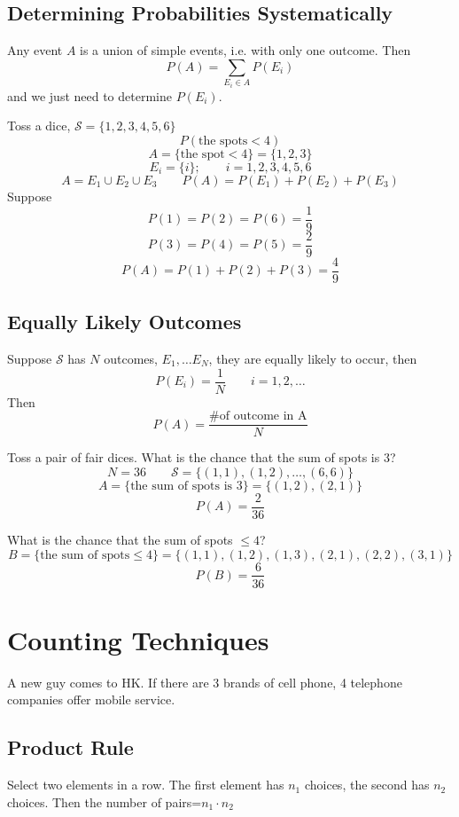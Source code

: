 \subsection{Determining Probabilities Systematically}
Any event $A$ is a union of simple events, i.e. with only one outcome.
Then\[P(A)=\sum_{E_i \in A}P(E_i)\]
and we just need to determine $P(E_i)$.

\begin{exmp}
Toss a dice, $\mathcal{S}=\{1,2,3,4,5,6\}$
\[P(\text{the spots}<4)\]
\[A=\{\text{the spot}< 4 \}=\{1,2,3\}\]
\[E_i=\{i\};\qquad i=1,2,3,4,5,6\]
\[A=E_1 \cup E_2 \cup E_3 \qquad  P(A)=P(E_1)+P(E_2)+P(E_3)\]
Suppose \[P(1)=P(2)=P(6)=\frac{1}{9}\]
\[P(3)=P(4)=P(5)=\frac{2}{9}\]
\[P(A)=P(1)+P(2)+P(3)=\frac{4}{9}\]
\end{exmp}

\subsection{Equally Likely Outcomes}
Suppose $\mathcal{S}$ has $N$ outcomes, $E_1,\dots E_N$, they are equally likely to occur, then
\[P(E_i)=\frac{1}{N} \qquad i=1,2,\dots\]
Then \[P(A)=\frac{\text{\# of outcome in A}}{N}\]

\begin{exmp}
Toss a pair of fair dices. What is the chance that the sum of spots is 3?
\[N=36 \qquad \mathcal{S}=\{(1,1),(1,2),\dots ,(6,6)\}\]
\[A=\{\text{the sum of spots is 3}\}=\{(1,2),(2,1)\}\]
\[P(A)=\frac{2}{36}\]
\end{exmp}

\begin{exmp}
What is the chance that the sum of spots $\leq 4$?
\[B=\{\text{the sum of spots}\leq 4\}=\{(1,1),(1,2),(1,3),(2,1),(2,2),(3,1)\}\]
\[P(B)=\frac{6}{36}\]
\end{exmp}

\section{Counting Techniques}
\begin{exmp}
A new guy comes to HK. If there are 3 brands of cell phone, 4 telephone companies offer mobile service.

\end{exmp}

\subsection{Product Rule}
Select two elements in a row. The first element has $n_1$ choices, the second has $n_2$ choices. Then the number of pairs=$n_1 \cdot n_2$


